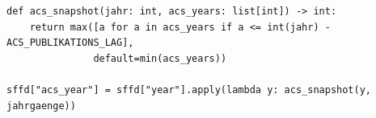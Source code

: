 %
%
%
%
%


\begin{lstlisting}[style=pythonstil,
  label={lst:acs-versatz},
  caption={Zeitbewusste Zuordnung des ACS-Jahrgangs
           (\texttt{prep/s1\_daten.py}, Z.~306--322 und 337, gekürzt)}]
def acs_snapshot(jahr: int, acs_years: list[int]) -> int:
    return max([a for a in acs_years if a <= int(jahr) - ACS_PUBLIKATIONS_LAG],
               default=min(acs_years))

sffd["acs_year"] = sffd["year"].apply(lambda y: acs_snapshot(y, jahrgaenge))
\end{lstlisting}


